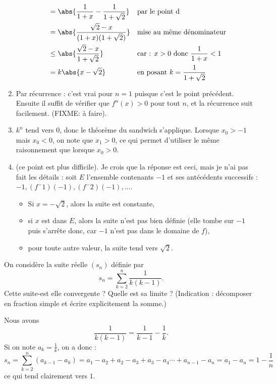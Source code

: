 \documentclass[12pt,french,oneside,a4paper]{memoir} %
\begin{document}
\begin{exo}
\begin{correction}
\begin{enumerate}
\begin{align*}
                              &= \abs{\frac 1{1+x} - \frac 1{1+\sqrt{2}}} && \text{par le point d}\\
                              &= \abs{\frac{\sqrt{2} - x}{(1+x)(1+\sqrt{2})}} && \text{mise au même dénominateur}\\
                              &\leq \abs{\frac{\sqrt{2} - x}{1+\sqrt{2}}} && \text{car : $x > 0$ donc $\frac{1}{1+x} < 1$}\\
                              &= k \abs{x - \sqrt{2}} && \text{en posant $k = \frac1{1+\sqrt{2}}$}
      \end{align*}
    \item Par récurrence : c'est vrai pour $n = 1$ puisque c'est le point précédent. Ensuite il suffit de vérifier que $f^{n}(x) > 0$ pour tout $n$, et la récurrence suit facilement. (FIXME: à faire).
    \item $k^n$ tend vers $0$, donc le théorème du sandwich s'applique. Lorsque $x_{0} > -1$ mais $x_{0} < 0$, on note que $x_{1} > 0$, ce qui permet d'utiliser le même raisonnement que lorsque $x_{0} > 0$.
    \item (ce point est plus difficile). Je crois que la réponse est ceci, mais je n'ai pas fait les détails : soit $E$ l'ensemble contenants $-1$ et ses antécédents successifs : $-1, (f^-1)(-1), (f^-2)(-1), ...$.
      \begin{itemize}
      \item Si $x = -\sqrt 2$, alors la suite est constante,
      \item si $x$ est dans $E$, alors la suite n'est pas bien définie (elle tombe sur $-1$ puis s'arrête donc, car $-1$ n'est pas dans le domaine de $f$),
      \item pour toute autre valeur, la suite tend vers $\sqrt 2$.
      \end{itemize}
    \end{enumerate}
\end{correction}
\end{exo}
\begin{exo}
On considère la suite réelle $(s_{n})$ définie par
\begin{equation*}
s_{n} = \sum_{k=2}^{n} \frac 1 {k(k-1)}.
\end{equation*}
Cette suite-est elle convergente ? Quelle est sa limite ? (Indication : décomposer en fraction simple et écrire explicitement la somme.)

\begin{correction}
  Nous avons
  \begin{equation*}
    \frac{1}{k(k-1)} = \frac{1}{k-1} - \frac{1}{k}.
  \end{equation*}
  Si on note $a_{k} = \frac 1k$, on a donc :
  \begin{equation*}
    s_{n} = \sum_{k=2}^{n} (a_{k-1} - a_{k}) = a_{1} - a_{2} + a_{2} - a_{3} + a_{3} - a_{4} \cdots + a_{n-1} - a_{n} = a_{1} - a_{n} = 1 - \frac{1}{n}
  \end{equation*}
  ce qui tend clairement vers $1$.
\end{correction}
\end{exo}
\end{document}
